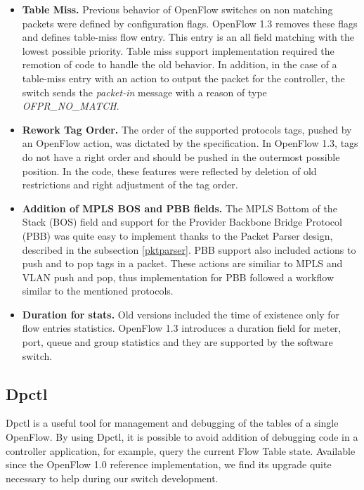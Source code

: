 \begin{itemize}
\item \textbf{Table Miss.} Previous behavior of OpenFlow switches on non matching packets were defined by configuration flags. OpenFlow 1.3 removes these flags and defines table-miss flow entry. This entry is an all field matching with the lowest possible priority. Table miss support implementation required the remotion of code to handle the old behavior. In addition, in the case of a table-miss entry with an action to output the packet for the controller, the switch sends the \textit{packet-in} message with a reason of type \textit{OFPR_NO_MATCH}.      

\item \textbf{Rework Tag Order.} The order of the supported protocols tags, pushed by an OpenFlow action, was dictated by the specification. In OpenFlow 1.3, tags do not have a right order and should be pushed in the outermost possible position. In the code, these features were reflected by deletion of old restrictions and right adjustment of the tag order. 

\item \textbf{Addition of MPLS BOS and PBB fields.} The MPLS Bottom of the Stack (BOS) field and support for the Provider Backbone Bridge Protocol (PBB) was quite easy to implement thanks to the Packet Parser design, described in the subsection \ref{pktparser}. PBB support also included actions to push and to pop tags in a packet. These actions are similiar to MPLS and VLAN push and pop, thus implementation for PBB followed a workflow similar to the mentioned protocols.  

\item \textbf{Duration for stats.} Old versions included the time of existence  only for flow entries statistics. OpenFlow 1.3 introduces a duration field for meter, port, queue and group statistics and they are supported by the software switch.  

\end{itemize}

\subsection{Dpctl}
\label{sec:sec47}

Dpctl is a useful tool for management and debugging of the tables of a single OpenFlow. By using Dpctl, it is possible to avoid addition of debugging code in a controller application, for example, query the current Flow Table state. Available since the OpenFlow 1.0 reference implementation, we find its upgrade quite necessary to help during our switch development. 

